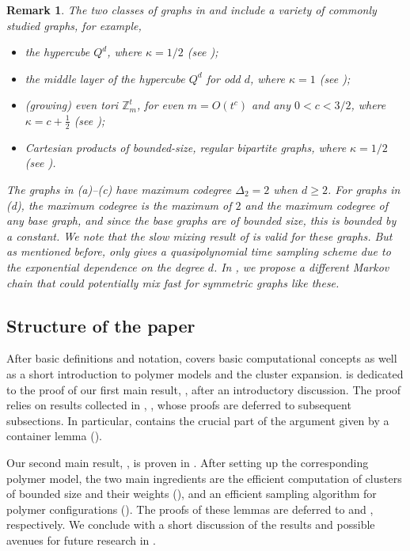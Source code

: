 \documentclass[reqno,a4paper,11pt]{amsart}
\newtheorem{remark}[theorem]{Remark}
\newcommand{\ex}{\kappa}
\newcommand{\codeg}{\Delta_2}
\begin{document}
\begin{remark}
    The two classes of graphs in  and  include a variety of commonly studied graphs, for example,
    \begin{itemize}
        \item[(a)] the hypercube $Q^d$, where $\ex = 1/2$ (see \cite{galvin2019independent});
        \item[(b)] the middle layer of the hypercube $Q^d$ for odd $d$, where $\ex = 1$ (see \cite{balogh2021independent});
        \item[(c)] (growing) even tori $\mathbb{Z}_m^t$, for even $m=O(t^c)$ and any $0<c<3/2$, where $\ex = c+\frac{1}{2}$ (see \cite{CEGK25, GeKaSaWdo25});
        \item[(d)] Cartesian products of bounded-size, regular bipartite graphs, where $\ex = 1/2$ (see \cite{CEGK25}).
    \end{itemize}
    The graphs in (a)--(c) have maximum codegree $\codeg = 2$ when $d \ge 2$. For graphs in (d), the maximum codegree is the maximum of $2$ and the maximum codegree of any base graph, and since the base graphs are of bounded size, this is bounded by a constant. We note that the slow mixing result of  is valid for these graphs. But as mentioned before,  only gives a quasipolynomial time sampling scheme due to the exponential dependence on the degree $d$. In , we propose a different Markov chain that could potentially mix fast for symmetric graphs like these. 
\end{remark}


\subsection{Structure of the paper}
After basic definitions and notation,  covers basic computational concepts as well as a short introduction to polymer models and the cluster expansion.  is dedicated to the proof of our first main result, , after an introductory discussion. The proof relies on results collected in , ,  whose proofs are deferred to subsequent subsections. In particular,  contains the crucial part of the argument given by a container lemma ().

Our second main result, , is proven in . After setting up the corresponding polymer model, the two main ingredients are the efficient computation of clusters of bounded size and their weights (), and an efficient sampling algorithm for polymer configurations (). The proofs of these lemmas are deferred to  and , respectively. We conclude with a short discussion of the results and possible avenues for future research in .
\end{document}
